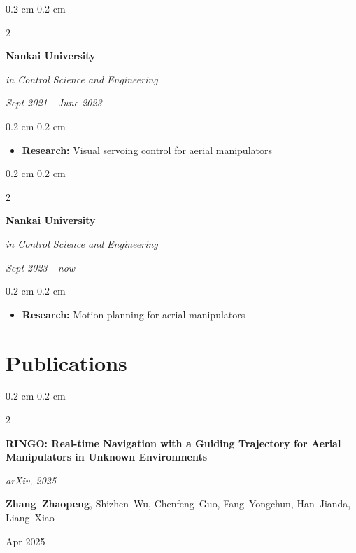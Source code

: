 \documentclass[10pt, letterpaper]{article}
\newenvironment{highlights}{
  \begin{itemize}[
    topsep=0.10 cm,
    parsep=0.10 cm,
    partopsep=0pt,
    itemsep=0pt,
    leftmargin=0.4 cm + 10pt
  ]
}{
    \end{itemize}
} %
\newenvironment{onecolentry}{
    \begin{adjustwidth}{
        0.2 cm
    }{
        0.2 cm
    }
}{
    \end{adjustwidth}
} %
\newenvironment{twocolentry}[2][]{
    \onecolentry
    \def\secondColumn{#2}
    \setcolumnwidth{\fill, 4.0 cm}
    \begin{paracol}{2}
}{
    \switchcolumn \raggedleft \secondColumn
    \end{paracol}
    \endonecolentry
} %
\begin{document}
  \begin{twocolentry}{\textit{Sept 2021 - June 2023}}
    \textbf{Nankai University}

     \textit{in Control Science and Engineering}
  \end{twocolentry}
  
  \vspace{0.1cm}
  
  \begin{onecolentry}
    \begin{highlights}
      \item \textbf{Research:} Visual servoing control for aerial manipulators
    \end{highlights}
  \end{onecolentry}

  \vspace{0.1cm}

  \begin{twocolentry}{\textit{Sept 2023 - now}}
    \textbf{Nankai University}

     \textit{in Control Science and Engineering}
  \end{twocolentry}
  
  \vspace{0.1cm}
  
  \begin{onecolentry}
    \begin{highlights}
      \item \textbf{Research:} Motion planning for aerial manipulators
    \end{highlights}
  \end{onecolentry}

\section{Publications}
\begin{twocolentry}{Apr 2025}
  \textbf{RINGO: Real-time Navigation with a Guiding Trajectory for Aerial Manipulators in Unknown Environments}
  \vspace{0.10 cm}

  \textit{arXiv, 2025}
  \vspace{0.10 cm}

  \mbox{\textbf{Zhang Zhaopeng}}, \mbox{Shizhen Wu}, \mbox{Chenfeng Guo}, \mbox{Fang Yongchun}, \mbox{Han Jianda}, \mbox{Liang Xiao}
\end{twocolentry}
\vspace{0.3 cm}
\end{document}
